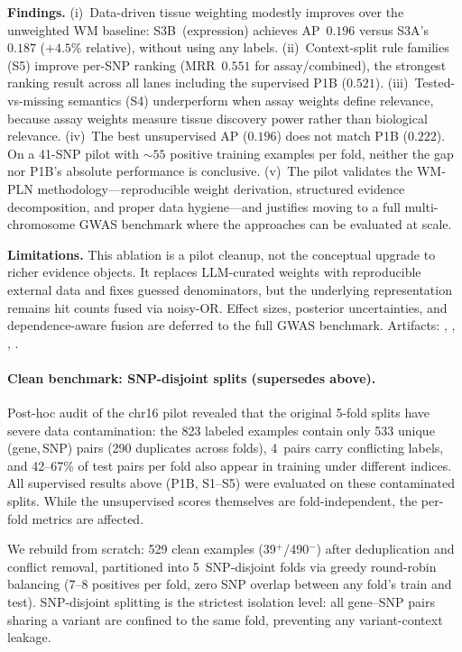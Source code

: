 \documentclass[11pt,openany]{report}
\begin{document}
\medskip\noindent
\textbf{Findings.}
(i)~Data-driven tissue weighting modestly improves over the unweighted
WM baseline: S3B~(expression) achieves AP~$0.196$ versus
S3A's~$0.187$ ($+4.5\%$ relative), without using any labels.
(ii)~Context-split rule families (S5) improve per-SNP ranking
(MRR~$0.551$ for assay/combined), the strongest ranking result
across all lanes including the supervised P1B ($0.521$).
(iii)~Tested-vs-missing semantics (S4) underperform when assay weights
define relevance, because assay weights measure tissue discovery
power rather than biological relevance.
(iv)~The best unsupervised AP ($0.196$) does not match P1B ($0.222$).
On a 41-SNP pilot with $\sim\!55$ positive training examples per fold,
neither the gap nor P1B's absolute performance is conclusive.
(v)~The pilot validates the WM-PLN methodology---reproducible
weight derivation, structured evidence decomposition, and proper
data hygiene---and justifies moving to a full multi-chromosome
GWAS benchmark where the approaches can be evaluated at scale.

\medskip\noindent
\textbf{Limitations.}
This ablation is a pilot cleanup, not the conceptual upgrade to richer
evidence objects.  It replaces LLM-curated weights with reproducible
external data and fixes guessed denominators, but the underlying
representation remains hit counts fused via noisy-OR\@.
Effect sizes, posterior uncertainties, and dependence-aware fusion
are deferred to the full GWAS benchmark.
Artifacts: ,
,
,
.

\paragraph{Clean benchmark: SNP-disjoint splits (supersedes above).}
Post-hoc audit of the chr16 pilot revealed that the original 5-fold splits
have severe data contamination: the 823 labeled examples contain only 533
unique (gene,\,SNP) pairs (290 duplicates across folds), 4~pairs carry
conflicting labels, and 42--67\% of test pairs per fold also appear in
training under different indices.  All supervised results above (P1B,
S1--S5) were evaluated on these contaminated splits.  While the
unsupervised scores themselves are fold-independent, the per-fold
metrics are affected.

We rebuild from scratch: 529 clean examples (39$^+$/490$^-$) after
deduplication and conflict removal, partitioned into 5~SNP-disjoint
folds via greedy round-robin balancing (7--8 positives per fold, zero
SNP overlap between any fold's train and test).
SNP-disjoint splitting is the strictest isolation level: all gene--SNP
pairs sharing a variant are confined to the same fold, preventing any
variant-context leakage.
\end{document}
